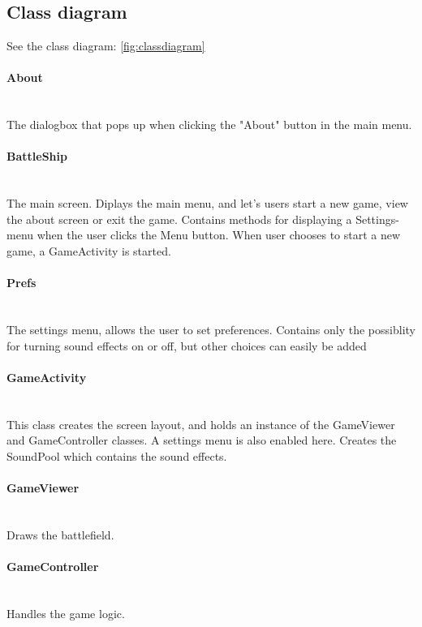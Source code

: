 \documentclass[12pt, a4paper]{article}
\begin{document}
\subsection{Class diagram}
See the class diagram: \ref{fig:classdiagram}

\paragraph{About} \\
	The dialogbox that pops up when clicking the "About" button in the main menu.

\paragraph{BattleShip} \\
	The main screen. Diplays the main menu, and let's users start a new game, view the about screen or exit the game. Contains methods for displaying a Settings-menu when the user clicks the Menu button.
When user chooses to start a new game, a GameActivity is started.

\paragraph{Prefs} \\
	The settings menu, allows the user to set preferences. Contains only the possiblity for turning sound effects on or off, but other choices can easily be added

\paragraph{GameActivity} \\
	This class creates the screen layout, and holds an instance of the GameViewer and GameController classes. A settings menu is also enabled here. Creates the SoundPool which contains the sound effects.

\paragraph{GameViewer} \\
	Draws the battlefield.

\paragraph{GameController} \\
	Handles the game logic.
\end{document}
